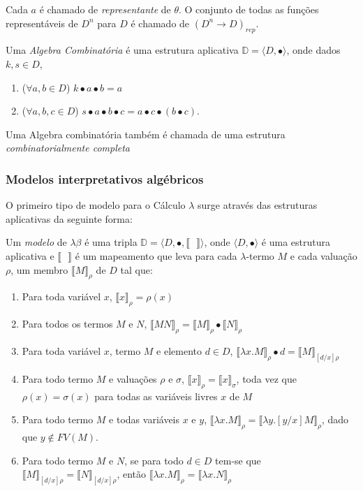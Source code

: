 \documentclass[../main.tex]{subfiles}
\begin{document}
Cada $a$ é chamado de \emph{representante} de $\theta$. O conjunto de todas as funções representáveis de $D^n$ para $D$ é chamado de $(D^n \to D)_{rep}$.


\begin{definition}
    Uma \emph{Algebra Combinatória} é uma estrutura aplicativa $\mathbb{D} = \langle D, \bullet \rangle$, onde dados $k, s \in D$,
    \begin{enumerate}
        \item ($\forall a, b \in D$) $k \bullet a \bullet b = a$
        \item ($\forall a, b, c \in D$) $s \bullet a \bullet b \bullet c = a \bullet c \bullet (b \bullet c)$.
    \end{enumerate}
\end{definition}

Uma Algebra combinatória também é chamada de uma estrutura \emph{combinatorialmente completa}

\subsubsection{Modelos interpretativos algébricos}

O primeiro tipo de modelo para o Cálculo $\lambda$ surge através das estruturas aplicativas da seguinte forma: 

\begin{definition}
    Um \emph{modelo} de $\lambda\beta$ é uma tripla $\mathbb{D} = \langle D, \bullet, \llbracket \text{  } \rrbracket  \rangle$, onde $\langle D, \bullet\rangle$ é uma estrutura aplicativa e $\llbracket \text{  } \rrbracket$ é um mapeamento que leva para cada $\lambda$-termo $M$ e cada valuação $\rho$, um membro $\llbracket M \rrbracket_{\rho}$ de $D$ tal que:
    \begin{enumerate}
        \item Para toda variável $x$, $\llbracket x \rrbracket_{\rho} = \rho(x)$
        \item Para todos os termos $M$ e $N$, $\llbracket MN \rrbracket_{\rho} = \llbracket M \rrbracket_{\rho} \bullet \llbracket N \rrbracket_{\rho}$
        \item Para toda variável $x$, termo $M$ e elemento $d \in D$, $\llbracket \lambda x . M \rrbracket_{\rho} \bullet d = \llbracket M \rrbracket_{[d/x]\rho}$ 
        \item Para todo termo $M$ e valuações $\rho$ e $\sigma$, $\llbracket x \rrbracket_{\rho} = \llbracket x \rrbracket_{\sigma}$, toda vez que $\rho(x) = \sigma(x)$ para todas as variáveis livres $x$ de $M$
        \item Para todo termo $M$ e todas variáveis $x$ e $y$, $\llbracket \lambda x . M \rrbracket_{\rho} = \llbracket \lambda y. [y/x] M \rrbracket_{\rho}$, dado que $y \not\in FV(M)$.
        \item Para todo termo $M$ e $N$, se para todo $d \in D$ tem-se que $\llbracket M \rrbracket_{[d/x]\rho} = \llbracket N \rrbracket_{[d/x]\rho}$, então $\llbracket \lambda x . M \rrbracket_{\rho} = \llbracket \lambda x . N \rrbracket_{\rho}$
    \end{enumerate}
\end{definition}
\end{document}
